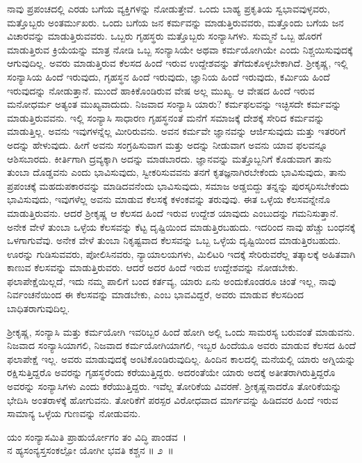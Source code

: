 ನಾವು ಪ್ರಪಂಚದಲ್ಲಿ ಎರಡು ಬಗೆಯ ವ್ಯಕ್ತಿಗಳನ್ನು ನೋಡುತ್ತೇವೆ. ಒಂದು ಬಾಹ್ಯ ಪ್ರಕೃತಿಯ ಸ್ವಭಾವವುಳ್ಳವರು, ಮತ್ತೊಬ್ಬರು ಅಂತರ್ಮುಖರು. ಒಂದು ಬಗೆಯ ಜನ ಕರ್ಮವನ್ನು ಮಾಡುತ್ತಿರುವವರು, ಮತ್ತೊಂದು ಬಗೆಯ ಜನ ವಿಚಾರವನ್ನು ಮಾಡುತ್ತಿರುವವರು. ಒಬ್ಬರು ಗೃಹಸ್ಥರು ಮತ್ತೊಬ್ಬರು ಸಂನ್ಯಾಸಿಗಳು. ಸುಮ್ಮನೆ ಒಬ್ಬ ಹೊರಗೆ ಮಾಡುತ್ತಿರುವ ಕ್ರಿಯೆಯನ್ನು ಮಾತ್ರ ನೋಡಿ ಒಬ್ಬ ಸಂನ್ಯಾಸಿಯೇ ಅಥವಾ ಕರ್ಮಯೋಗಿಯೇ ಎಂದು ನಿಶ್ಚಯಿಸುವುದಕ್ಕೆ ಆಗುವುದಿಲ್ಲ. ಅವರು ಮಾಡುತ್ತಿರುವ ಕೆಲಸದ ಹಿಂದೆ ಇರುವ ಉದ್ದೇಶವನ್ನು ತೆಗೆದುಕೊಳ್ಳಬೇಕಾಗಿದೆ. ಶ‍್ರೀಕೃಷ್ಣ, ಇಲ್ಲಿ ಸಂನ್ಯಾಸಿಯ ಹಿಂದೆ ಇರುವುದು, ಗೃಹಸ್ಥನ ಹಿಂದೆ ಇರುವುದು, ಜ್ಞಾನಿಯ ಹಿಂದೆ ಇರುವುದು, ಕರ್ಮಿಯ ಹಿಂದೆ ಇರುವುದನ್ನು ನೋಡುತ್ತಾನೆ. ಮುಂದೆ ಹಾಕಿಕೊಂಡಿರುವ ವೇಷ ಅಲ್ಲ ಮುಖ್ಯ. ಆ ವೇಷದ ಹಿಂದೆ ಇರುವ ಮನೋಧರ್ಮ ಅತ್ಯಂತ ಮುಖ್ಯವಾದುದು. ನಿಜವಾದ ಸಂನ್ಯಾಸಿ ಯಾರು? ಕರ್ಮಫಲವನ್ನು ಇಚ್ಛಿಸದೇ ಕರ್ಮವನ್ನು ಮಾಡುತ್ತಿರುವವನು. ಇಲ್ಲಿ ಸಂನ್ಯಾಸಿ ಸಾಧಾರಣ ಗೃಹಸ್ಥನಂತೆ ಮನೆಗೆ ಸಮಾಜಕ್ಕೆ ದೇಶಕ್ಕೆ ಸೇರಿದ ಕರ್ಮವನ್ನು ಮಾಡುತ್ತಿಲ್ಲ. ಅವನು ಇವುಗಳನ್ನೆಲ್ಲ ಮೀರಿರುವನು. ಅವನ ಕರ್ಮವೇ ಜ್ಞಾನವನ್ನು ಆರ್ಜಿಸುವುದು ಮತ್ತು ಇತರರಿಗೆ ಅದನ್ನು ಹೇಳುವುದು. ಹೀಗೆ ಅವನು ಸಂಗ್ರಹಿಸುವಾಗ ಮತ್ತು ಅದನ್ನು ನೀಡುವಾಗ ಅವನು ಯಾವ ಫಲವನ್ನೂ ಆಶಿಸಬಾರದು. ಕೀರ್ತಿಗಾಗಿ ದ್ರವ್ಯಕ್ಕಾಗಿ ಅದನ್ನು ಮಾಡಬಾರದು. ಜ್ಞಾನವನ್ನು ಮತ್ತೊಬ್ಬನಿಗೆ ಕೊಡುವಾಗ ತಾನು ತುಂಬಾ ದೊಡ್ಡವನು ಎಂದು ಭಾವಿಸುವುದು, ಸ್ವೀಕರಿಸುವವನು ತನಗೆ ಕೃತಜ್ಞನಾಗಿರಬೇಕೆಂದು ಭಾವಿಸುವುದು, ತಾನು ಪ್ರಪಂಚಕ್ಕೆ ಮಹದುಪಕಾರವನ್ನು ಮಾಡಿದವನೆಂದು ಭಾವಿಸುವುದು, ಸಮಾಜ ಅಡ್ಡಬಿದ್ದು ತನ್ನನ್ನು ಪುರಸ್ಕರಿಸಬೇಕೆಂದು ಭಾವಿಸುವುದು, ಇವುಗಳೆಲ್ಲ ಅವನು ಮಾಡುವ ಕೆಲಸಕ್ಕೆ ಕಳಂಕವನ್ನು ತರುವುವು. ಈತ ಒಳ್ಳೆಯ ಕೆಲಸವನ್ನೇನೊ ಮಾಡುತ್ತಿರುವನು. ಆದರೆ ಶ‍್ರೀಕೃಷ್ಣ ಆ ಕೆಲಸದ ಹಿಂದೆ ಇರುವ ಉದ್ದೇಶ ಯಾವುದು ಎಂಬುದನ್ನು ಗಮನಿಸುತ್ತಾನೆ. ಅನೇಕ ವೇಳೆ ತುಂಬಾ ಒಳ್ಳೆಯ ಕೆಲಸವನ್ನು ಕೆಟ್ಟ ದೃಷ್ಟಿಯಿಂದ ಮಾಡುತ್ತಿರಬಹುದು. ಇದರಿಂದ ನಾವು ಹೆಚ್ಚು ಬಂಧನಕ್ಕೆ ಒಳಗಾಗುವೆವು. ಅನೇಕ ವೇಳೆ ತುಂಬಾ ನಿಕೃಷ್ಟವಾದ ಕೆಲಸವನ್ನು ಒಬ್ಬ ಒಳ್ಳೆಯ ದೃಷ್ಟಿಯಿಂದ ಮಾಡುತ್ತಿರಬಹುದು. ಊರನ್ನು ಗುಡಿಸುವವರು, ಪೋಲಿಸಿನವರು, ನ್ಯಾಯಾಲಯಗಳು, ಮಿಲಿಟರಿ ಇದಕ್ಕೆ ಸೇರಿರುವರೆಲ್ಲ ತತ್ಕಾಲಕ್ಕೆ ಅಹಿತವಾಗಿ ಕಾಣುವ ಕೆಲಸವನ್ನು ಮಾಡುತ್ತಿರುವರು. ಆದರೆ ಅದರ ಹಿಂದೆ ಇರುವ ಉದ್ದೇಶವನ್ನು ನೋಡಬೇಕು. ಫಲಾಪೇಕ್ಷೆಯಿಲ್ಲದೆ, ಇದು ನಮ್ಮ ಪಾಲಿಗೆ ಬಂದ ಕರ್ತವ್ಯ, ಯಾರು ಏನು ಅಂದುಕೊಂಡರೂ ಚಿಂತೆ ಇಲ್ಲ, ನಾವು ನಿರ್ವಂಚನೆಯಿಂದ ಈ ಕೆಲಸವನ್ನು ಮಾಡಬೇಕು, ಎಂಬ ಭಾವವಿದ್ದರೆ, ಅವರು ಮಾಡುವ ಕೆಲಸದಿಂದ ಬಾಧಿತರಾಗುವುದಿಲ್ಲ.

ಶ‍್ರೀಕೃಷ್ಣ, ಸಂನ್ಯಾಸಿ ಮತ್ತು ಕರ್ಮಯೋಗಿ ಇವರಿಬ್ಬರ ಹಿಂದೆ ಹೋಗಿ ಅಲ್ಲಿ ಒಂದು ಸಾಮರಸ್ಯ ಬರುವಂತೆ ಮಾಡುವನು. ನಿಜವಾದ ಸಂನ್ಯಾಸಿಯಾಗಲಿ, ನಿಜವಾದ ಕರ್ಮಯೋಗಿಯಾಗಲಿ, ಇಬ್ಬರ ಹಿಂದೆಯೂ ಅವರು ಮಾಡುವ ಕೆಲಸದ ಹಿಂದೆ ಫಲಾಪೇಕ್ಷೆ ಇಲ್ಲ. ಅವರು ಮಾಡುವುದಕ್ಕೆ ಅಂಟಿಕೊಂಡಿರುವುದಿಲ್ಲ. ಹಿಂದಿನ ಕಾಲದಲ್ಲಿ ಮನೆಯಲ್ಲಿ ಯಾರು ಅಗ್ನಿಯನ್ನು ರಕ್ಷಿಸುತ್ತಿದ್ದರೊ ಅವರನ್ನು ಗೃಹಸ್ಥರೆಂದು ಕರೆಯುತ್ತಿದ್ದರು. ಅದರಂತೆಯೇ ಯಾರು ಅದಕ್ಕೆ ಅತೀತರಾಗಿರುತ್ತಿದ್ದರೊ ಅವರನ್ನು ಸಂನ್ಯಾಸಿಗಳು ಎಂದು ಕರೆಯುತ್ತಿದ್ದರು. ಇವೆಲ್ಲ ತೋರಿಕೆಯ ವಿವರಣೆ. ಶ‍್ರೀಕೃಷ್ಣನಾದರೊ ತೋರಿಕೆಯನ್ನು ಭೇದಿಸಿ ಅಂತರಾಳಕ್ಕೆ ಹೋಗುವನು. ತೋರಿಕೆಗೆ ಪರಸ್ಪರ ವಿರೋಧವಾದ ಮಾರ್ಗವನ್ನು ಹಿಡಿದವರ ಹಿಂದೆ ಇರುವ ಸಾಮಾನ್ಯ ಒಳ್ಳೆಯ ಗುಣವನ್ನು ನೋಡುವನು.

\begin{shloka}
ಯಂ ಸಂನ್ಯಾಸಮಿತಿ ಪ್ರಾಹುರ್ಯೋಗಂ ತಂ ವಿದ್ಧಿ ಪಾಂಡವ~।\\ನ ಹ್ಯಸಂನ್ಯಸ್ತಸಂಕಲ್ಪೋ ಯೋಗೀ ಭವತಿ ಕಶ್ಚನ \hfill॥ ೨~॥
\end{shloka}

